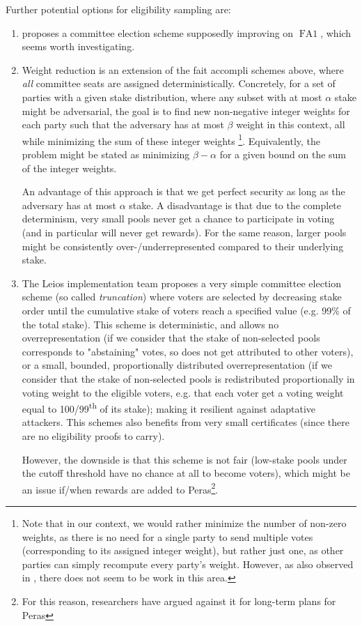 Further potential options for eligibility sampling are:
\begin{enumerate}
\item
  \cite{alpenglow} proposes a committee election scheme supposedly improving on $\operatorname{FA1}$, which seems worth investigating.
\item
  Weight reduction \parencite{tonkikh2024swiper,cryptoeprint:2025/1076} is an extension of the fait accompli schemes above, where \emph{all} committee seats are assigned deterministically.
  Concretely, for a set of parties with a given stake distribution, where any subset with at most $\alpha$ stake might be adversarial, the goal is to find new non-negative integer weights for each party such that the adversary has at most $\beta$ weight in this context, all while minimizing the sum of these integer weights%
  \footnote{Note that in our context, we would rather minimize the number of non-zero weights, as there is no need for a single party to send multiple votes (corresponding to its assigned integer weight), but rather just one, as other parties can simply recompute every party's weight. However, as also observed in \cite{cryptoeprint:2025/1076}, there does not seem to be work in this area.}.
  Equivalently, the problem might be stated as minimizing $\beta-\alpha$ for a given bound on the sum of the integer weights.

  An advantage of this approach is that we get perfect security as long as the adversary has at most $\alpha$ stake.
  A disadvantage is that due to the complete determinism, very small pools never get a chance to participate in voting (and in particular will never get rewards).
  For the same reason, larger pools might be consistently over-/underrepresented compared to their underlying stake.
\item
  The Leios implementation team proposes a very simple committee election scheme (so called \emph{truncation}) where voters are selected by decreasing stake order until the cumulative stake of voters reach a specified value (e.g. 99\% of the total stake). This scheme is deterministic, and allows no overrepresentation (if we consider that the stake of non-selected pools corresponds to "abstaining" votes, so does not get attributed to other voters), or a small, bounded, proportionally distributed overrepresentation (if we consider that the stake of non-selected pools is redistributed proportionally in voting weight to the eligible voters, e.g. that each voter get a voting weight equal to 100/99\textsuperscript{th} of its stake); making it resilient against adaptative attackers. This schemes also benefits from very small certificates (since there are no eligibility proofs to carry).

  However, the downside is that this scheme is not fair (low-stake pools under the cutoff threshold have no chance at all to become voters), which might be an issue if/when rewards are added to Peras\footnote{For this reason, researchers have argued against it for long-term plans for Peras}.
\end{enumerate}

